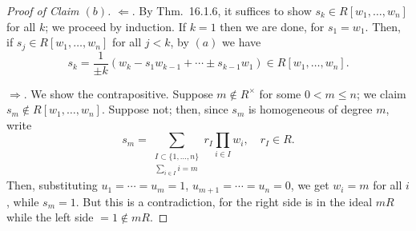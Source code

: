 \documentclass[12pt]{article}
\theoremstyle{remark}
\begin{document}
\begin{proof}[Proof of Claim $(b)$]
  $\Leftarrow$. By Thm.~16.1.6, it suffices to show $s_k \in R[w_1,\ldots,w_n]$ for all $k$; we proceed by induction. If $k=1$ then we are done, for $s_1=w_1$. Then, if $s_j \in R[w_1,\ldots,w_n]$ for all $j < k$, by $(a)$ we have
  \begin{equation*}
    s_k = \frac{1}{\pm k}(w_k - s_1w_{k-1} + \cdots \pm s_{k-1}w_1) \in R[w_1,\ldots,w_n].
  \end{equation*}
  \par $\Rightarrow$. We show the contrapositive. Suppose $m \notin R^\times$ for some $0 < m \le n$; we claim $s_m \notin R[w_1,\ldots,w_n]$. Suppose not; then, since $s_m$ is homogeneous of degree $m$, write
  \begin{equation*}
    s_m = \sum_{\substack{I \subset \{1,\ldots,n\}\\\sum_{i\in I} i = m}} r_I\prod_{i \in I}w_i, \quad r_I \in R.
  \end{equation*}
  Then, substituting $u_1=\cdots=u_m=1$, $u_{m+1}=\cdots=u_n=0$, we get $w_i = m$ for all $i$, while $s_m = 1$. But this is a contradiction, for the right side is in the ideal $mR$ while the left side $=1 \notin mR$.
\end{proof}
\end{document}
